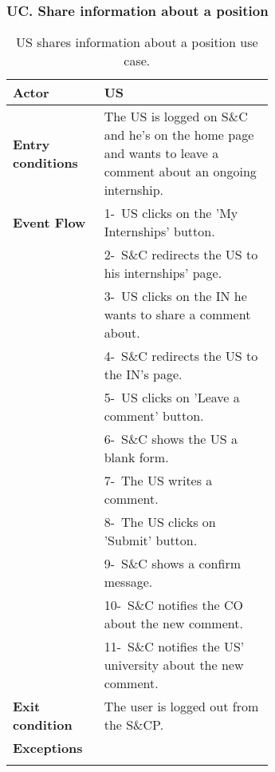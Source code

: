 \subsubsection*{UC\cuc . Share information about a position}
\begin{center}
    \begin{longtable}{|l|p{0.65\linewidth}|}
        \hline
        \textbf{Actor}            & US \\
        \hline
        \textbf{Entry conditions} & The US is logged on S\&C and he's on the home page and wants to leave a comment about an ongoing internship. \\
        \hline
        \textbf{Event Flow}       & 1-\ US clicks on the 'My Internships' button.  \\
        & 2-\ S\&C redirects the US to his internships' page.\\
        & 3-\ US clicks on the IN he wants to share a comment about. \\
        & 4-\ S\&C redirects the US to the IN's page. \\
        & 5-\ US clicks on 'Leave a comment' button. \\
        & 6-\ S\&C shows the US a blank form.\\
        & 7-\ The US writes a comment. \\
        & 8-\ The US clicks on 'Submit' button.  \\
        & 9-\ S\&C shows a confirm message.\\
        & 10-\ S\&C notifies the CO about the new comment.\\
        & 11-\ S\&C notifies the US' university about the new comment.\\
        \hline
        \textbf{Exit condition}   &  The user is logged out from the S\&CP. \\
        \hline
        \textbf{Exceptions}   \\
        \hline
        \caption{US shares information about a position use case.}
        \label{tab: cp_use_case}
    \end{longtable}
\end{center}

